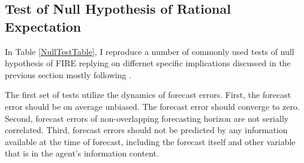 \documentclass[]{article}
\begin{document}
\subsection{Test of Null Hypothesis of Rational Expectation}

In Table \ref{NullTestTable}, I reproduce a number of commonly used tests of null hypothesis of FIRE replying on differnet specific implications discussed in the previous section mostly following \citet{mankiw2003disagreement}. 

The first set of tests utilize the dynamics of forecast errors. First, the forecast error should be on average unbiased. The forecast error should converge to zero. Second, forecast errors of non-overlapping forecasting horizon are not serially correlated.  Third, forecast errors should not be predicted by any information available at the time of forecast, including the forecast itself and other variable that is in the agent's information content. 
\end{document}
